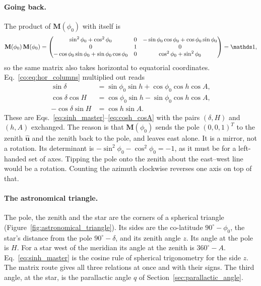 \paragraph{Going back.} The product of $\mathbf M(\phi_0)$ with itself is
\begin{equation}
	\mathbf M(\phi_0)\,\mathbf M(\phi_0)
	=\begin{pmatrix}\sin^2\phi_0+\cos^2\phi_0&0&-\sin\phi_0\cos\phi_0+\cos\phi_0\sin\phi_0\\0&1&0\\-\cos\phi_0\sin\phi_0+\sin\phi_0\cos\phi_0&0&\cos^2\phi_0+\sin^2\phi_0\end{pmatrix}=\Id ,
\end{equation}
so the same matrix also takes horizontal to equatorial coordinates. Eq.~\eqref{co:eq:hor_columns} multiplied out reads
\begin{equation}
	\boxed{\begin{aligned}
	\sin\delta &= \sin\phi_0\sin h + \cos\phi_0\cos h\cos A,\\
	\cos\delta\cos H &= \cos\phi_0\sin h - \sin\phi_0\cos h\cos A,\\
	-\cos\delta\sin H &= \cos h\sin A .
	\end{aligned}}
	\label{co:eq:hor_to_eq}
\end{equation}
These are Eqs.~\eqref{eq:sinh_master}--\eqref{eq:cosh_cosA} with the pairs $(\delta,H)$ and $(h,A)$ exchanged. The reason is that $\mathbf M(\phi_0)$ sends the pole $(0,0,1)^T$ to the zenith $\hat{\mathbf u}$ and the zenith back to the pole, and leaves east alone. It is a mirror, not a rotation. Its determinant is $-\sin^2\phi_0-\cos^2\phi_0=-1$, as it must be for a left-handed set of axes. Tipping the pole onto the zenith about the east--west line would be a rotation. Counting the azimuth clockwise reverses one axis on top of that.

\paragraph{The astronomical triangle.} The pole, the zenith and the star are the corners of a spherical triangle (Figure~\ref{fig:astronomical_triangle}). Its sides are the co-latitude $90^\circ-\phi_0$, the star's distance from the pole $90^\circ-\delta$, and its zenith angle $z$. Its angle at the pole is $H$. For a star west of the meridian its angle at the zenith is $360^\circ-A$. Eq.~\eqref{eq:sinh_master} is the cosine rule of spherical trigonometry for the side $z$. The matrix route gives all three relations at once and with their signs. The third angle, at the star, is the parallactic angle $q$ of Section~\ref{sec:parallactic_angle}.

